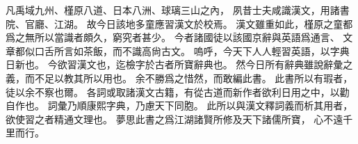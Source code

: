 凡禹域九州、槿原八道、日本八洲、球璃三山之內，
夙昔士夫咸識漢文，用諸書院、官廳、江湖。
故今日該地多童應習漢文於校焉。
漢文雖重如此，槿原之童都爲之無所以當識者頗久，窮究者甚少。
今者諸國徒以該國京辭與英語爲通言、
文章都似口舌所言如茶飯，而不識高尙古文。
嗚呼，今天下人人輕習英語，以字典日新也。
今欲習漢文也，迄檢字於古者所寶辭典也。
然今日所有辭典雖說辭彙之義，而不足以教其所以用也。
余不勝爲之惜然，而敢編此書。
此書所以有瑕者，徒以余不察也爾。
各詞或取諸漢文古籍，有從古道而新作者欲利日用之中，以勸自作也。
詞彙乃順康熙字典，乃慮天下同胞。
此所以與漢文釋詞義而析其用者，欲使習之者精通文理也。
夢思此書之爲江湖諸賢所修及天下諸儒所寶，
心不遠千里而行。
